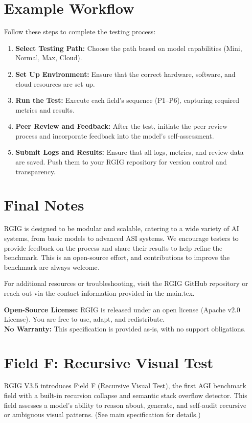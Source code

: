 \section*{Example Workflow}
Follow these steps to complete the testing process:

\begin{enumerate}
  \item \textbf{Select Testing Path:} Choose the path based on model capabilities (Mini, Normal, Max, Cloud).
  \item \textbf{Set Up Environment:} Ensure that the correct hardware, software, and cloud resources are set up.
  \item \textbf{Run the Test:} Execute each field's sequence (P1–P6), capturing required metrics and results.
  \item \textbf{Peer Review and Feedback:} After the test, initiate the peer review process and incorporate feedback into the model's self-assessment.
  \item \textbf{Submit Logs and Results:} Ensure that all logs, metrics, and review data are saved. Push them to your RGIG repository for version control and transparency.
\end{enumerate}

\section*{Final Notes}
RGIG is designed to be modular and scalable, catering to a wide variety of AI systems, from basic models to advanced ASI systems. We encourage testers to provide feedback on the process and share their results to help refine the benchmark. This is an open-source effort, and contributions to improve the benchmark are always welcome.

For additional resources or troubleshooting, visit the RGIG GitHub repository or reach out via the contact information provided in the main.tex.

\textbf{Open-Source License:} RGIG is released under an open license (Apache v2.0 License). You are free to use, adapt, and redistribute. \\
\textbf{No Warranty:} This specification is provided as-is, with no support obligations.

\section*{Field F: Recursive Visual Test}
RGIG V3.5 introduces Field F (Recursive Visual Test), the first AGI benchmark field with a built-in recursion collapse and semantic stack overflow detector. This field assesses a model's ability to reason about, generate, and self-audit recursive or ambiguous visual patterns. (See main specification for details.)

